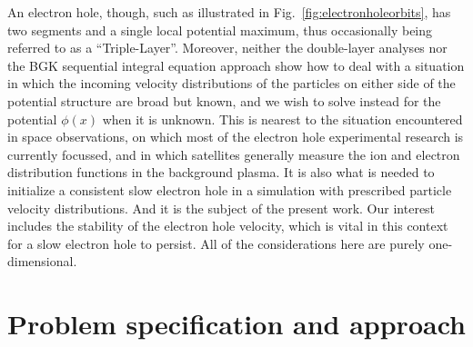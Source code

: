 \documentclass[12pt]{article}
\begin{document}
An electron hole, though, such as illustrated in Fig.\
\ref{fig:electronholeorbits}, has two segments and a single local
potential maximum, thus occasionally being referred to as a
``Triple-Layer''. Moreover, neither the double-layer analyses nor the
BGK sequential integral equation approach show how to deal with a
situation in which the incoming velocity distributions of the
particles on either side of the potential structure are broad but
known, and we wish to solve instead for the potential $\phi(x)$ when
it is unknown. This is nearest to the situation encountered in space
observations, on which most of the electron hole experimental research
is currently focussed, and in which satellites generally measure the
ion and electron distribution functions in the background plasma. It
is also what is needed to initialize a consistent slow electron hole
in a simulation with prescribed particle velocity distributions. And
it is the subject of the present work. Our interest includes the
stability of the electron hole velocity, which is vital in this
context for a slow electron hole to persist. All of the considerations
here are purely one-dimensional.

\section{Problem specification and  approach}
\end{document}
